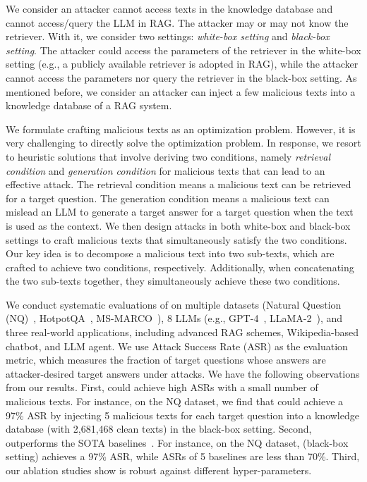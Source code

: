 We consider an attacker cannot access texts in the knowledge database and cannot access/query the LLM in RAG. The attacker may or may not know the retriever. With it, we consider two settings: \emph{white-box setting} and \emph{black-box setting}. The attacker could access the parameters of the retriever in the white-box setting (e.g., a publicly available retriever is adopted in RAG), while the attacker cannot access the parameters nor query the retriever in the black-box setting. As mentioned before, we consider an attacker can inject a few malicious texts into a knowledge database of a RAG system. 




We formulate crafting malicious texts as an optimization problem. However, it is very challenging to directly solve the optimization problem. In response, we resort to heuristic solutions that involve deriving two conditions, namely \emph{retrieval condition} and \emph{generation condition} for malicious texts that can lead to an effective attack. The retrieval condition means a malicious text can be retrieved for a target question. The generation condition means a malicious text can mislead an LLM to generate a target answer for a target question when the text is used as the context. 
We then design attacks in both white-box and black-box settings to craft malicious texts that simultaneously satisfy the two conditions. Our key idea is to decompose a malicious text into two sub-texts, which are crafted to achieve two conditions, respectively. Additionally, when concatenating the two sub-texts together, they simultaneously achieve these two conditions. 

\noindent
{} We conduct systematic evaluations of {\name} on multiple datasets (Natural Question (NQ)~\cite{kwiatkowski2019natural}, HotpotQA~\cite{yang2018hotpotqa}, MS-MARCO~\cite{nguyen2016ms}), 8 LLMs (e.g., GPT-4~\cite{achiam2023gpt}, LLaMA-2~\cite{touvron2023llama}), and three real-world applications, including advanced RAG schemes, Wikipedia-based chatbot, and LLM agent. We use Attack Success Rate (ASR) 
as the evaluation metric, which measures the fraction of target questions whose answers are attacker-desired target answers under attacks. We have the following observations from our results. First, {\name} could achieve high ASRs with a small number of malicious texts. For instance, on the NQ dataset, we find that {\name} could achieve a 97\% ASR by injecting 5 malicious texts for each target question into a knowledge database (with 2,681,468 clean texts) in the black-box setting. Second, {\name} outperforms the SOTA 
baselines~\cite{liu2023prompt,zhong2023poisoning}. For instance, on the NQ dataset, {\name} (black-box setting) achieves a 97\% ASR, while ASRs of 5 baselines are less than 70\%.
Third, our ablation studies show {\name} is robust against different hyper-parameters.


